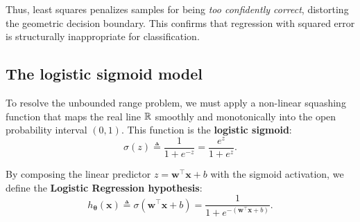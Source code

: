 Thus, least squares penalizes samples for being \textit{too confidently correct}, distorting the geometric decision boundary. This confirms that regression with squared error is structurally inappropriate for classification.

\subsection{The logistic sigmoid model}
\label{sec:logistic_sigmoid_formulation}

To resolve the unbounded range problem, we must apply a non-linear squashing function that maps the real line $\mathbb{R}$ smoothly and monotonically into the open probability interval $(0, 1)$. This function is the \textbf{logistic sigmoid}:
\begin{equation}
\sigma(z) \triangleq \frac{1}{1 + e^{-z}} = \frac{e^z}{1 + e^z}.
\label{eq:sigmoid_def}
\end{equation}

By composing the linear predictor $z = \mathbf{w}^\top \mathbf{x} + b$ with the sigmoid activation, we define the \textbf{Logistic Regression hypothesis}:
\begin{equation}
h_{\boldsymbol{\theta}}(\mathbf{x}) \triangleq \sigma(\mathbf{w}^\top \mathbf{x} + b) = \frac{1}{1 + e^{-(\mathbf{w}^\top \mathbf{x} + b)}}.
\label{eq:logistic_regression_hypothesis}
\end{equation}

